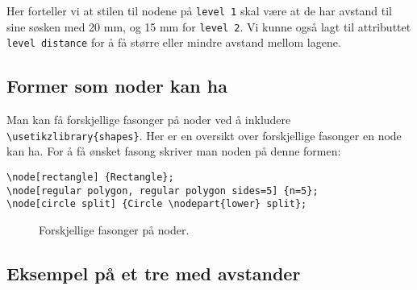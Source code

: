 \documentclass[11pt, a4paper]{article}
\begin{document}
Her forteller vi at stilen til nodene på \texttt{level 1} skal være at de har avstand til sine søsken med 20 mm, og 15 mm for \texttt{level 2}. Vi kunne også lagt til attributtet \texttt{level distance} for å få større eller mindre avstand mellom lagene. 

\newpage

\subsection{Former som noder kan ha}
Man kan få forskjellige fasonger på noder ved å inkludere \texttt{\textbackslash usetikzlibrary\{shapes\}}. Her er en oversikt over forskjellige fasonger en node kan ha. For å få ønsket fasong skriver man noden på denne formen:
\begin{Verbatim}[fontsize=\small, frame=single]
\node[rectangle] {Rectangle};
\node[regular polygon, regular polygon sides=5] {n=5};
\node[circle split] {Circle \nodepart{lower} split};
\end{Verbatim}

\begin{figure}[h!]
\centering
{}
\caption{Forskjellige fasonger på noder.}
\end{figure}


\newpage

\subsection{Eksempel på et tre med avstander}
\end{document}
